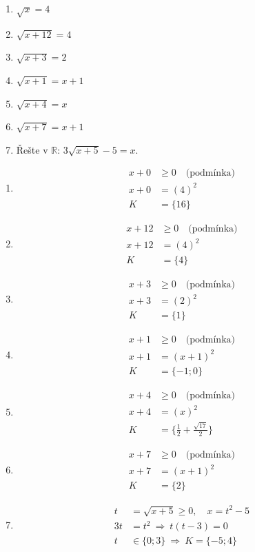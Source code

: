 \documentclass[11pt,a4paper]{article}
\begin{document}
\begin{zadaniReseniBox}[title={Domácí úkol}]
\begin{enumerate}[label=\alph*),itemsep=2pt]
\item $\sqrt{x}=4$
\item $\sqrt{x + 12}=4$
\item $\sqrt{x + 3}=2$
\item $\sqrt{x + 1}=x + 1$
\item $\sqrt{x + 4}=x$
\item $\sqrt{x + 7}=x + 1$
\item Řešte v $\mathbb R$: $3\sqrt{x+5}-5=x$.
\end{enumerate}
\tcblower
\begin{enumerate}[label=\alph*),itemsep=2pt]
\item
\[\begin{aligned}
x+0&\ge0\quad\text{(podmínka)}\\[2pt]
x+0&=(4)^2\\[2pt]
K&=\{16\}
\end{aligned}\]
\item
\[\begin{aligned}
x+12&\ge0\quad\text{(podmínka)}\\[2pt]
x+12&=(4)^2\\[2pt]
K&=\{4\}
\end{aligned}\]
\item
\[\begin{aligned}
x+3&\ge0\quad\text{(podmínka)}\\[2pt]
x+3&=(2)^2\\[2pt]
K&=\{1\}
\end{aligned}\]
\item
\[\begin{aligned}
x+1&\ge0\quad\text{(podmínka)}\\[2pt]
x+1&=(x + 1)^2\\[2pt]
K&=\{-1;0\}
\end{aligned}\]
\item
\[\begin{aligned}
x+4&\ge0\quad\text{(podmínka)}\\[2pt]
x+4&=(x)^2\\[2pt]
K&=\{\frac{1}{2} + \frac{\sqrt{17}}{2}\}
\end{aligned}\]
\item
\[\begin{aligned}
x+7&\ge0\quad\text{(podmínka)}\\[2pt]
x+7&=(x + 1)^2\\[2pt]
K&=\{2\}
\end{aligned}\]
\item \[ \begin{aligned}t&=\sqrt{x+5}\ge0,\quad x=t^2-5\\3t&=t^2\ \Rightarrow\ t(t-3)=0\\t&\in\{0;3\}\ \Rightarrow\ K=\{-5;4\}\end{aligned}\]
\end{enumerate}
\end{zadaniReseniBox}
\end{document}
